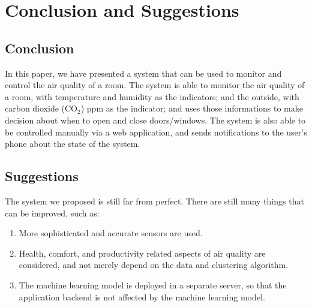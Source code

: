 \section{Conclusion and Suggestions}

\subsection{Conclusion}
In this paper, we have presented a system that can be
used to monitor and control the air quality of a room.
The system is able to monitor the air quality of a room,
with temperature and humidity as the indicators; and
the outside, with carbon dioxide (CO$_2$) ppm as the indicator;
and uses those informations to make decision about when to
open and close doors/windows.
The system is also able to be controlled manually via a web
application, and sends notifications to the user's phone
about the state of the system.

\subsection{Suggestions}
The system we proposed is still far from perfect.
There are still many things that can be improved, such as:
\begin{enumerate}
      \item More sophisticated and accurate sensors are
            used.
      \item Health, comfort, and productivity related
            aspects of air quality are considered,
            and not merely depend on the data and
            clustering algorithm.
      \item The machine learning model is deployed
            in a separate server, so that the
            application backend is not affected
            by the machine learning model.
\end{enumerate}
